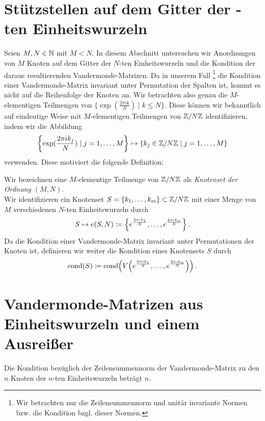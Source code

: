 \section{Stützstellen auf dem Gitter der -ten Einheitswurzeln}
Seien $M, N \in \mathbb{N}$ mit $M < N$.
In diesem Abschnitt untersuchen wir Anordnungen von $M$ Knoten auf dem Gitter
der $N$-ten Einheitswurzeln und die Kondition der daraus resultierenden
Vandermonde-Matrizen.
Da in unserem Fall
\footnote{Wir betrachten nur die Zeilensummennorm und unitär invariante Normen bzw. die Kondition bzgl. dieser Normen.}
die Kondition einer Vandermonde-Matrix invariant unter
Permutation der Spalten ist, kommt es nicht auf die Reihenfolge der Knoten an.
Wir betrachten also genau die $M$-elementigen Teilmengen von
$\{ \exp( \frac{2 \pi i k}{N} ) \; | \; k \leq N \}$.
Diese können wir bekanntlich auf eindeutige Weise mit $M$-elementigen
Teilmengen von $ \mathbb{Z} / N\mathbb{Z}$ identifizieren, indem wir die Abbildung
\[
    \left\{ \exp( \frac{2 \pi i k_j}{N} ) \; | \; j = 1,\dots, M \right\} \mapsto \left\{ k_j \in \mathbb{Z}/N\mathbb{Z} \; | \; j = 1, \dots, M \right\}
\]
verwenden.
Diese motiviert die folgende Definition:

\begin{mydef}[Knotenset]
    Wir bezeichnen eine $M$-elementige Teilmenge von $\mathbb{Z}/N\mathbb{Z}$
    als \emph{Knotenset der Ordnung $(M,N)$}.\\
    Wir identifizieren ein Knotenset
    $S = \{k_1, \dots, k_m\} \subset \mathbb{Z}/N\mathbb{Z}$
    mit einer Menge von $M$ verschiedenen $N$-ten Einheitswurzeln durch
    \[
        S \mapsto e(S, N) \coloneqq \left\{ e^{\frac{2 \pi i k_1}{N}}, \dots, e^{\frac{2 \pi i k_n}{N}} \right\}.
    \]
    Da die Kondition einer Vandermonde-Matrix invariant unter Permutationen der
    Knoten ist, definieren wir weiter die Kondition eines Knotensets $S$ durch
    \[
        \text{cond}\! \left( S \right) \coloneqq \text{cond}\! \left( V \! \left(  e^{\frac{2 \pi i k_1}{N}}, \dots, e^{\frac{2 \pi i k_n}{N}}  \right) \right).
    \]
\end{mydef}

\section{Vandermonde-Matrizen aus  Einheitswurzeln und einem Ausreißer}

Die Kondition bezüglich der Zeilensummennorm der Vandermonde-Matrix zu den $n$
Knoten der $n$-ten Einheitswurzeln beträgt $n$.

